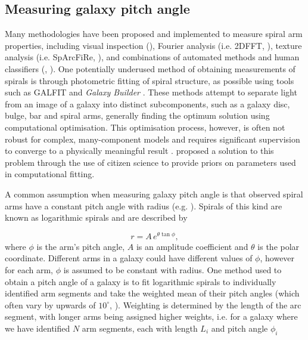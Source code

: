 \label{section:method}

\subsection{Measuring galaxy pitch angle}
Many methodologies have been proposed and implemented to measure spiral arm properties, including visual inspection (\citealt{2015A&A...582A..86H}), Fourier analysis (i.e. \textsc{2DFFT}, \citealt{2012ApJS..199...33D}), texture analysis (i.e. SpArcFiRe, \citealt{2014ApJ...790...87D}), and combinations of automated methods and human classifiers (\citealt{2017MNRAS.472.2263H}, \citealt{2020MNRAS.493.3854H}). One potentially underused method of obtaining measurements of spirals is through photometric fitting of spiral structure, as possible using tools such as \textsc{GALFIT} \citep{2010AJ....139.2097P} and \textit{Galaxy Builder} \citep{2020arXiv200610450L}. These methods attempt to separate light from an image of a galaxy into distinct subcomponents, such as a galaxy disc, bulge, bar and spiral arms, generally finding the optimum solution using computational optimisation. This optimisation process, however, is often not robust for complex, many-component models and requires significant supervision to converge to a physically meaningful result \citep{Gao2017:1709.00746v1}. \citet{2020arXiv200610450L} proposed a solution to this problem through the use of citizen science to provide priors on parameters used in computational fitting.

A common assumption when measuring galaxy pitch angle is that observed spiral arms have a constant pitch angle with radius (e.g. \citealt{2012ApJS..199...33D,2013MNRAS.436.1074S,2014ApJ...790...87D}). Spirals of this kind are known as logarithmic spirals and are described by

\begin{equation}
  \label{eq:log-spiral}
r = A\,e^{\theta\tan\phi},
\end{equation}
%
where $\phi$ is the arm's pitch angle, $A$ is an amplitude coefficient and $\theta$ is the polar coordinate. Different arms in a galaxy could have different values of $\phi$, however for each arm, $\phi$ is assumed to be constant with radius. One method used to obtain a pitch angle of a galaxy is to fit logarithmic spirals to individually identified arm segments and take the weighted mean of their pitch angles (which often vary by upwards of $10^\circ$, \citealt{2014ApJ...790...87D}). Weighting is determined by the length of the arc segment, with longer arms being assigned higher weights, i.e. for a galaxy where we have identified $N$ arm segments, each with length $L_i$ and pitch angle $\phi_i$

